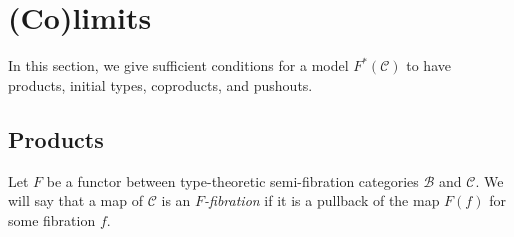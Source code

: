 \documentclass[reqno]{amsart}
\theoremstyle{definition}
\theoremstyle{remark}
\newcommand{\scat}[1]{\mathcal{#1}}
\numberwithin{figure}{section}
\begin{document}
\section{(Co)limits}

In this section, we give sufficient conditions for a model $F^*(\scat{C})$ to have products, initial types, coproducts, and pushouts.

\subsection{Products}

Let $F$ be a functor between type-theoretic semi-fibration categories $\scat{B}$ and $\scat{C}$.
We will say that a map of $\scat{C}$ is an \emph{$F$-fibration} if it is a pullback of the map $F(f)$ for some fibration $f$.
\end{document}
